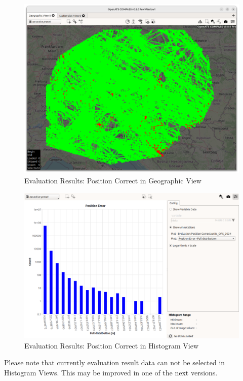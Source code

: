 \begin{figure}[H]
  \hspace*{-2.5cm}
    \includegraphics[width=19cm]{figures/geo_eval_pos_correct.png}
  \caption{Evaluation Results: Position Correct in Geographic View}
\end{figure}

\begin{figure}[H]
  \hspace*{-2.5cm}
    \includegraphics[width=19cm]{figures/histogram_eval_pos_correct.png}
  \caption{Evaluation Results: Position Correct in Histogram View}
\end{figure}

Please note that currently evaluation result data can not be selected in Histogram Views. This may be improved in one of the next versions. \\

